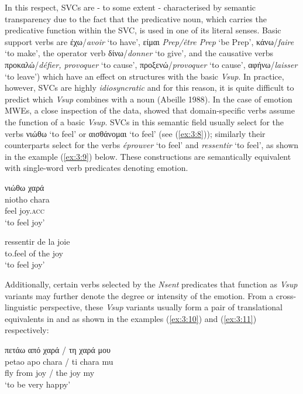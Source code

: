 \documentclass[output=paper]{langsci/langscibook}
\begin{document}
In this respect, SVCs are - to some extent - characterised by
semantic transparency due to the fact that the predicative noun, which
carries the predicative function within the SVC, is used in one of its
literal senses. Basic support verbs are έχω/\textit{avoir }‘to have’,
είμαι \textit{Prep/être Prep }‘be Prep’, κάνω/\textit{faire }‘to make’,
the operator verb δίνω/\textit{donner }‘to give’\textit{,} and the
causative verbs προκαλώ/\textit{défier, provoquer }‘to cause’, προξενώ/\textit{provoquer }‘to cause’, αφήνω/\textit{laisser }‘to leave’) which
have an effect on structures with the basic \textit{Vsup}. In practice,
however, SVCs are highly \textit{idiosyncratic} and for this
reason, it is quite difficult to predict which \textit{Vsup} combines
with a noun (Abeille 1988). In the case of emotion MWEs, a close
inspection of the data, showed that domain-specific verbs assume the
function of a basic \textit{Vsup}.  SVCs in this
semantic field usually select for the verbs νιώθω ‘to feel’ or
αισθάνομαι ‘to feel’ (see (\ref{ex:3:8})); similarly
their  counterparts select for the verbs \textit{éprouver} ‘to feel’
and \textit{ressentir }‘to feel’, as shown in the example (\ref{ex:3:9}) below.
These constructions are semantically equivalent with single-word verb
predicates denoting emotion.

\begin{exe}
\ex \label{ex:3:8}
\glll νιώθω χαρά \\
niotho chara\\
feel joy.\textsc{acc}\\
\glt %
‘to feel joy’
\end{exe}

\begin{exe}
\ex \label{ex:3:9}
\gll ressentir de la joie \\
to.feel of the joy\\
\glt ‘to feel joy’
\end{exe}

Additionally, certain verbs selected by the \textit{Nsent} predicates
that function as \textit{Vsup} variants may further denote the degree or
 intensity of the emotion. From a  cross-linguistic perspective, these
\textit{Vsup} variants usually form a pair of translational equivalents
in  and  as shown in the examples (\ref{ex:3:10}) and (\ref{ex:3:11}) respectively:

\begin{exe}
\ex \label{ex:3:10}
\glll  πετάω από χαρά / τη χαρά μου \\
petao apo chara / ti chara mu\\
fly from joy / the joy my\\
\glt %
‘to be very happy’
\end{exe}
\end{document}
